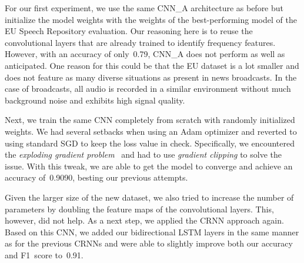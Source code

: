 For our first experiment, we use the same CNN\_A architecture as before but initialize the model weights with the weights of the best-performing model of the EU Speech Repository evaluation. Our reasoning here is to reuse the convolutional layers that are already trained to identify frequency features. However, with an accuracy of only~\num{0.79}, CNN\_A does not perform as well as anticipated. One reason for this could be that the EU dataset is a lot smaller and does not feature as many diverse situations as present in news broadcasts. In the case of broadcasts, all audio is recorded in a similar environment without much background noise and exhibits high signal quality.

Next, we train the same CNN completely from scratch with randomly initialized weights. We had several setbacks when using an Adam optimizer and reverted to using standard SGD to keep the loss value in check. Specifically, we encountered the \emph{exploding gradient problem}~\cite[p.~288]{Goodfellow-et-al-2016} and had to use \emph{gradient clipping} to solve the issue. With this tweak, we are able to get the model to converge and achieve an accuracy of~\num{0.9090}, besting our previous attempts.

Given the larger size of the new dataset, we also tried to increase the number of parameters by doubling the feature maps of the convolutional layers. This, however, did not help. As a next step, we applied the CRNN approach again. Based on this CNN, we added our bidirectional LSTM layers in the same manner as for the previous CRNNs and were able to slightly improve both our accuracy and F1~score to~\num{0.91}.

